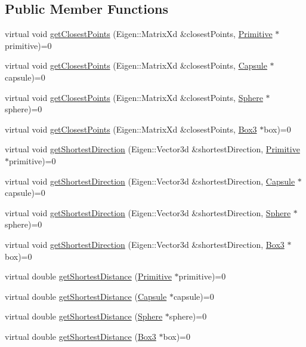 \subsection*{Public Member Functions}
\begin{DoxyCompactItemize}
\item 
virtual void \hyperlink{class_primitive_ae838e4e129f05642994da59f08f85f56}{get\+Closest\+Points} (Eigen\+::\+Matrix\+Xd \&closest\+Points, \hyperlink{class_primitive}{Primitive} $\ast$primitive)=0
\item 
virtual void \hyperlink{class_primitive_a2b8b8dea111d9eda31f72e06b47e9aa9}{get\+Closest\+Points} (Eigen\+::\+Matrix\+Xd \&closest\+Points, \hyperlink{class_capsule}{Capsule} $\ast$capsule)=0
\item 
virtual void \hyperlink{class_primitive_ac86ef47d59c21448ce78c91490c7dbd4}{get\+Closest\+Points} (Eigen\+::\+Matrix\+Xd \&closest\+Points, \hyperlink{class_sphere}{Sphere} $\ast$sphere)=0
\item 
virtual void \hyperlink{class_primitive_a1c5cfb220351b16f538e2085c717a52f}{get\+Closest\+Points} (Eigen\+::\+Matrix\+Xd \&closest\+Points, \hyperlink{class_box3}{Box3} $\ast$box)=0
\item 
virtual void \hyperlink{class_primitive_ae37bbdf5271bf278b19888e0428579a8}{get\+Shortest\+Direction} (Eigen\+::\+Vector3d \&shortest\+Direction, \hyperlink{class_primitive}{Primitive} $\ast$primitive)=0
\item 
virtual void \hyperlink{class_primitive_af9bd724a6618bd76e41e5682caa25023}{get\+Shortest\+Direction} (Eigen\+::\+Vector3d \&shortest\+Direction, \hyperlink{class_capsule}{Capsule} $\ast$capsule)=0
\item 
virtual void \hyperlink{class_primitive_a3f1bc91de29fa904657c1ba4c40eee53}{get\+Shortest\+Direction} (Eigen\+::\+Vector3d \&shortest\+Direction, \hyperlink{class_sphere}{Sphere} $\ast$sphere)=0
\item 
virtual void \hyperlink{class_primitive_a4f478b272b35ba4f2188a8f1308b5b3b}{get\+Shortest\+Direction} (Eigen\+::\+Vector3d \&shortest\+Direction, \hyperlink{class_box3}{Box3} $\ast$box)=0
\item 
virtual double \hyperlink{class_primitive_a340b3e5540b910480ada939383985d66}{get\+Shortest\+Distance} (\hyperlink{class_primitive}{Primitive} $\ast$primitive)=0
\item 
virtual double \hyperlink{class_primitive_a46e60acfe4c005c0ec94e1e8b82d36db}{get\+Shortest\+Distance} (\hyperlink{class_capsule}{Capsule} $\ast$capsule)=0
\item 
virtual double \hyperlink{class_primitive_adaac4fc4fedf9cd76d4eb9c77e9ae560}{get\+Shortest\+Distance} (\hyperlink{class_sphere}{Sphere} $\ast$sphere)=0
\item 
virtual double \hyperlink{class_primitive_abe0be322f473e299109b9dda724b2972}{get\+Shortest\+Distance} (\hyperlink{class_box3}{Box3} $\ast$box)=0
\end{DoxyCompactItemize}
